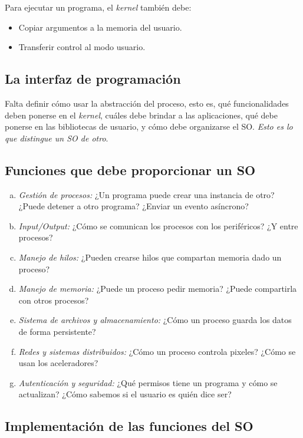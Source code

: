 \documentclass[a4paper,10pt,spanish]{article}
\begin{document}
Para ejecutar un programa, el \textit{kernel} también debe:

\begin{itemize}
\item Copiar argumentos a la memoria del usuario.
\item Transferir control al modo usuario.
\end{itemize}

\subsection{La interfaz de programación}

Falta definir cómo usar la abstracción del proceso, esto es, qué funcionalidades deben ponerse en el \textit{kernel}, cuáles debe brindar a las aplicaciones, qué debe ponerse en las bibliotecas de usuario, y cómo debe organizarse el SO. \textit{Esto es lo que distingue un SO de otro}. \\

\subsection{Funciones que debe proporcionar un SO}

\begin{enumerate}[a.]
\item \textit{Gestión de procesos:} ¿Un programa puede crear una instancia de otro? ¿Puede detener a otro programa? ¿Enviar un evento asíncrono?
\item \textit{Input/Output:} ¿Cómo se comunican los procesos con los periféricos? ¿Y entre procesos?
\item \textit{Manejo de hilos:} ¿Pueden crearse hilos que compartan memoria dado un proceso?
\item \textit{Manejo de memoria:} ¿Puede un proceso pedir memoria? ¿Puede compartirla con otros procesos?
\item \textit{Sistema de archivos y almacenamiento:} ¿Cómo un proceso guarda los datos de forma persistente?
\item \textit{Redes y sistemas distribuidos:} ¿Cómo un proceso controla pixeles? ¿Cómo se usan los aceleradores?
\item \textit{Autenticación y seguridad:} ¿Qué permisos tiene un programa y cómo se actualizan? ¿Cómo sabemos si el usuario es quién dice ser?
\end{enumerate}

\subsection{Implementación de las funciones del SO}
\end{document}
